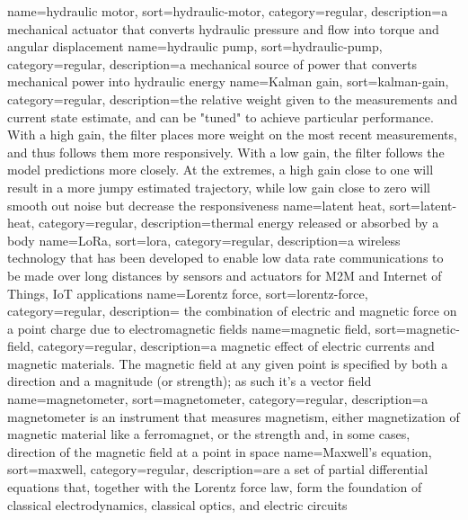 %
{%
  name={hydraulic motor},%
  sort={hydraulic-motor},%
  category={regular},%
  description={a mechanical actuator that converts hydraulic pressure and flow into torque and angular displacement}%
}
%
{%
  name={hydraulic pump},%
  sort={hydraulic-pump},%
  category={regular},%
  description={a mechanical source of power that converts mechanical power into hydraulic energy}%
}
%
{%
  name={Kalman gain},%
  sort={kalman-gain},%
  category={regular},%
  description={the relative weight given to the measurements and current state estimate, and can be "tuned" to achieve particular performance. With a high gain, the filter places more weight on the most recent measurements, and thus follows them more responsively. With a low gain, the filter follows the model predictions more closely. At the extremes, a high gain close to one will result in a more jumpy estimated trajectory, while low gain close to zero will smooth out noise but decrease the responsiveness}%
}
%
{%
  name={latent heat},%
  sort={latent-heat},%
  category={regular},%
  description={thermal energy released or absorbed by a body}%
}
%
{%
  name={LoRa},%
  sort={lora},%
  category={regular},%
  description={a wireless technology that has been developed to enable low data rate communications to be made over long distances by sensors and actuators for M2M and Internet of Things, IoT applications}%
}
%
{%
  name={Lorentz force},%
  sort={lorentz-force},%
  category={regular},%
  description={ the combination of electric and magnetic force on a point charge due to electromagnetic fields}%
}
%
{%
  name={magnetic field},%
  sort={magnetic-field},%
  category={regular},%
  description={a magnetic effect of electric currents and magnetic materials. The magnetic field at any given point is specified by both a direction and a magnitude (or strength); as such it's a vector field}%
}
%
{%
  name={magnetometer},%
  sort={magnetometer},%
  category={regular},%
  description={a magnetometer is an instrument that measures magnetism, either magnetization of magnetic material like a ferromagnet, or the strength and, in some cases, direction of the magnetic field at a point in space}%
}
%
{%
  name={Maxwell's equation},%
  sort={maxwell},%
  category={regular},%
  description={are a set of partial differential equations that, together with the Lorentz force law, form the foundation of classical electrodynamics, classical optics, and electric circuits}%
}
